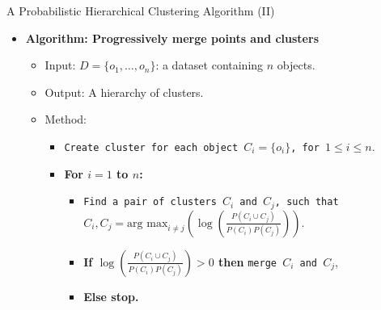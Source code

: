 \begin{frame}{A Probabilistic Hierarchical Clustering Algorithm (II)}
	\centering
	\begin{itemize}
		\item \textbf{Algorithm: Progressively merge points and clusters}
		\begin{itemize}
			\item Input: $D = \{o_1, \ldots, o_n\}$: a dataset containing $n$ 
			objects.
			\item Output: A hierarchy of clusters.
			\item Method:
			\begin{itemize}
				\item \texttt{Create cluster for each object $C_i = \{o_i\}$, 
				for $1 \leq i \leq n$}.
				\item \textbf{For $i=1$ to $n$:}
				\begin{itemize}
					\item \texttt{Find a pair of clusters $C_i$ and $C_j$, such 
					that}\\
					$C_i, C_j = \text{arg max}_{i \neq j} \left( \log\left( 
					\frac{P(C_i \cup C_j)}{P(C_i)P(C_j)} \right) \right)$.
					\item \textbf{If $\log\left( \frac{P(C_i \cup 
					C_j)}{P(C_i)P(C_j)}\right) > 0$ then} \texttt{merge $C_i$ 
					and $C_j$},
					\item \textbf{Else stop.}
				\end{itemize}
			\end{itemize}
		\end{itemize}
	\end{itemize}
\end{frame}